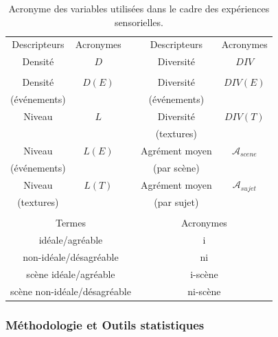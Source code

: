\begin{table}[t]
\centering
\begin{tabular}{c c c c c} 
Descripteurs          & Acronymes   &   & Descripteurs            & Acronymes  \\                       
\cline{1-2} \cline{4-5}
Densité               & $D$         &   & Diversité               & $DIV$    \\
                      &             &   &                         &          \\
Densité               & $D(E)$      &   & Diversité               & $DIV(E)$ \\
(événements)          &             &   & (événements)            &          \\
Niveau                & $L$         &   & Diversité               & $DIV(T)$ \\
                      &             &   & (textures)              &          \\
Niveau                & $L(E)$      &   & Agrément moyen          & $\mathcal{A}_{scene}$     \\
(événements)          &             &   & (par scène)             &         \\
Niveau                & $L(T)$      &   & Agrément moyen          & $\mathcal{A}_{sujet}$        \\
(textures)            &             &   & (par sujet)             &      \\
                      &             &   &                         &      \\
\multicolumn{3}{c}{Termes} &  \multicolumn{2}{c}{Acronymes} \\ 
\hline
\multicolumn{3}{c}{idéale/agréable}                & \multicolumn{2}{c}{i}       \\
\multicolumn{3}{c}{non-idéale/désagréable}         & \multicolumn{2}{c}{ni}      \\
\multicolumn{3}{c}{scène idéale/agréable}          & \multicolumn{2}{c}{i-scène} \\
\multicolumn{3}{c}{scène non-idéale/désagréable}   & \multicolumn{2}{c}{ni-scène} \\
\hline
\end{tabular}
\vspace{0.5mm}
\caption{Acronyme des variables utilisées dans le cadre des expériences sensorielles.}
\label{tab:acronyme}
\end{table}


\subsubsection{Méthodologie et Outils statistiques}
\label{sec:ch5_methodoEtStat1}

